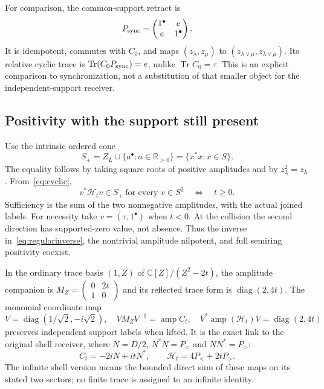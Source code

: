 \documentclass[11pt,a4paper]{article}
\theoremstyle{definition}\newtheorem{definition}[theorem]{Definition}\newtheorem{remark}[theorem]{Remark}
\newcommand{\C}{\mathbb C}\newcommand{\R}{\mathbb R}\newcommand{\Z}{\mathbb Z}\newcommand{\B}{\mathbb B}
\newcommand{\Tr}{\operatorname{Tr}}\newcommand{\im}{\operatorname{im}}\newcommand{\diag}{\operatorname{diag}}\newcommand{\rad}{\operatorname{rad}}\newcommand{\Spec}{\operatorname{Spec}}\newcommand{\Ann}{\operatorname{Ann}}\newcommand{\Disc}{\operatorname{Disc}}\newcommand{\Hom}{\operatorname{Hom}}\newcommand{\Res}{\operatorname{Res}}
\newcommand{\amp}{\operatorname{amp}}\newcommand{\supp}{\operatorname{supp}}\newcommand{\one}{1^\bullet}
\begin{document}
For comparison, the common-support retract is
\[
 P_{\rm sync}=\begin{pmatrix}\one&e\\e&\one\end{pmatrix}.
\]
It is idempotent, commutes with $C_0$, and maps $(z_\lambda,z_\mu)$ to $(z_{\lambda\vee\mu},z_{\lambda\vee\mu})$. Its relative cyclic trace is $\Tr(C_0P_{\rm sync})=e$, unlike $\Tr C_0=\tau$. This is an explicit comparison to synchronization, not a substitution of that smaller object for the independent-support receiver.

\subsection{Positivity with the support still present}
Use the intrinsic ordered cone
\begin{equation}
 S_+=Z_L\cup\{a^\bullet:a\in\R_{>0}\}=\{x^*x:x\in S\}.
                                                        \label{eq:cone}
\end{equation}
The equality follows by taking square roots of positive amplitudes and by $z_\lambda^2=z_\lambda$. From~\eqref{eq:cyclic},
\begin{equation}
 v^*\mathcal H_tv\in S_+\ \text{for every }v\in S^2
 \quad\Longleftrightarrow\quad t\ge0.                   \label{eq:positive}
\end{equation}
Sufficiency is the sum of the two nonnegative amplitudes, with the actual joined labels. For necessity take $v=(\tau,\one)$ when $t<0$. At the collision the second direction has supported-zero value, not absence. Thus the inverse in~\eqref{eq:regularinverse}, the nontrivial amplitude nilpotent, and full semiring positivity coexist.

In the ordinary trace basis $(1,Z)$ of $\C[Z]/(Z^2-2t)$, the amplitude companion is $M_Z=\left(\begin{smallmatrix}0&2t\\1&0\end{smallmatrix}\right)$ and its reflected trace form is $\diag(2,4t)$. The monomial coordinate map
\begin{equation}
 V=\diag(1/\sqrt2,-i\sqrt2),\quad VM_ZV^{-1}=\amp C_t,
 \quad V^*\amp(\mathcal H_t)V=\diag(2,4t)                \label{eq:traceiso}
\end{equation}
preserves independent support labels when lifted. It is the exact link to the original shell receiver, where $N=D/2$, $N^*N=P_{<}$ and $NN^*=P_{>}$:
\[
 C_t=-2iN+itN^*,\qquad\mathcal H_t=4P_{<}+2tP_{>}.
\]
The infinite shell version means the bounded direct sum of these maps on its stated two sectors; no finite trace is assigned to an infinite identity.
\end{document}
